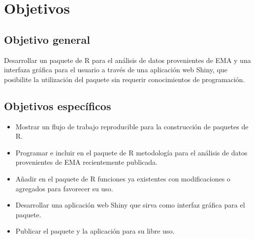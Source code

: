 \chapter{Objetivos}
\section{Objetivo general}
 
Desarrollar un paquete de R para el análisis de datos provenientes de EMA y una interfaza gráfica para el usuario a través de una aplicación web Shiny, que posibilite la utilización del paquete sin requerir conocimientos de programación.


\section{Objetivos específicos}
\begin{itemize}
\item Mostrar un flujo de trabajo reproducible para la construcción de paquetes de R.
\item Programar e incluir en el paquete de R metodología para el análisis de datos provenientes de EMA recientemente publicada.
\item Añadir en el paquete de R funciones ya existentes con modificaciones o agregados para favorecer su uso.
\item Desarrollar una aplicación web Shiny que sirva como interfaz gráfica para el paquete.
\item Publicar el paquete y la aplicación para su libre uso.
\end{itemize}

